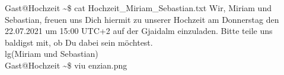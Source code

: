 \documentclass[12pt, a5paper]{article}
\begin{document}
\noindent
{\selectfont
\lbrack Gast@Hochzeit \textasciitilde\rbrack\$ cat Hochzeit\_Miriam\_Sebastian.txt
Wir, Miriam und Sebastian, freuen uns Dich hiermit zu unserer Hochzeit am Donnerstag den 22.07.2021 um 15:00 UTC+2 auf der Gjaidalm einzuladen. Bitte teile uns baldigst mit, ob Du dabei sein möchtest.\\ lg(Miriam und Sebastian) \\
\lbrack Gast@Hochzeit \textasciitilde\rbrack\$ viu enzian.png\\
\vspace*{-40px}
\begin{figure}[H]
\end{figure}
}
\end{document}
